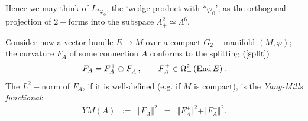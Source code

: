 \documentclass{article}
\newcommand{\func}[1]{\textnormal {#1\,}}
\begin{document}
Hence we may think of $L_{\ast \varphi _{0}}$, the `wedge product with $\ast\varphi _{0}$', as the orthogonal projection of $2-$forms into the subspace $\Lambda
_{+}^{2}\simeq \Lambda ^{6}$.

\label{Sub energy bounds}
Consider now a vector bundle $E\rightarrow M$ over a compact $G_{2}-$manifold $\left(
M,\varphi \right) $; the curvature $F_{A} $ of some connection $A$ conforms to
the splitting $\left( \ref{split}\right) $:%
\begin{equation*}
        F_{A}=F_{A}^{+}\oplus F_{A}^{-},
        \qquad  F_{A}^{\pm }\in \Omega _{\pm }^{2}\left(\func{End}E\right).
\end{equation*}%
The $L^2-$norm of $F_{A}$, if it is well-defined (e.g. if $M$ is compact), is the \emph{Yang-Mills functional}:%
\begin{equation}        \label{YM(A)}
\begin{array}{rcccl}
        YM\left( A\right) 
        &:=& \Vert F_{A}\Vert ^{2}
        &=&\Vert F_{A}^{+}\Vert ^{2}
        +\Vert F_{A}^{-}\Vert ^{2}.
\end{array}
\end{equation}
\end{document}
